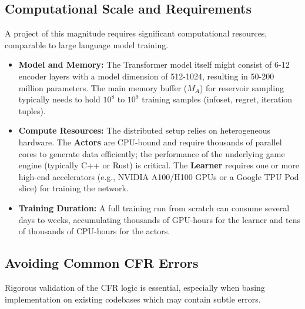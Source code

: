\documentclass[11pt,a4paper]{article}
\begin{document}
\subsection{Computational Scale and Requirements}

A project of this magnitude requires significant computational resources, comparable to large language model training.
\begin{itemize}
    \item \textbf{Model and Memory:} The Transformer model itself might consist of 6-12 encoder layers with a model dimension of 512-1024, resulting in 50-200 million parameters. The main memory buffer ($M_A$) for reservoir sampling typically needs to hold $10^8$ to $10^9$ training samples (infoset, regret, iteration tuples).
    \item \textbf{Compute Resources:} The distributed setup relies on heterogeneous hardware. The \textbf{Actors} are CPU-bound and require thousands of parallel cores to generate data efficiently; the performance of the underlying game engine (typically C++ or Rust) is critical. The \textbf{Learner} requires one or more high-end accelerators (e.g., NVIDIA A100/H100 GPUs or a Google TPU Pod slice) for training the network.
    \item \textbf{Training Duration:} A full training run from scratch can consume several days to weeks, accumulating thousands of GPU-hours for the learner and tens of thousands of CPU-hours for the actors.
\end{itemize}

\subsection{Avoiding Common CFR Errors}

Rigorous validation of the CFR logic is essential, especially when basing implementation on existing codebases which may contain subtle errors.
\end{document}
